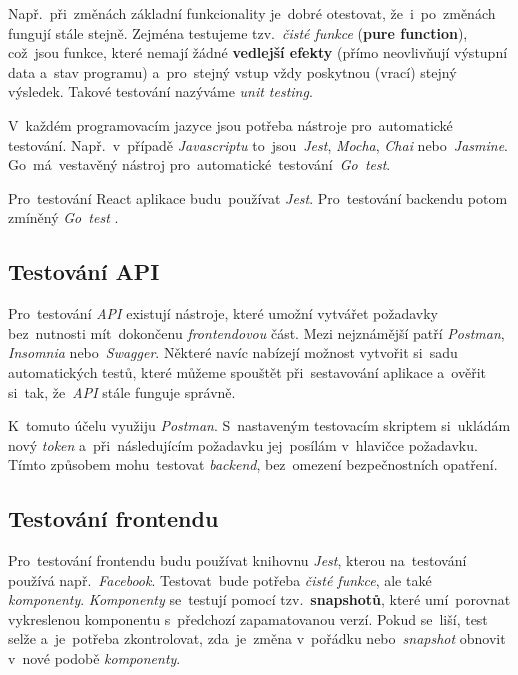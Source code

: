 \documentclass[11pt,a4paper]{report}
\begin{document}
            Např.~při~změnách základní funkcionality je~dobré otestovat, že~i~po~změnách fungují stále stejně. Zejména testujeme tzv.~\emph{čisté funkce} (\textbf{pure function}), což~jsou funkce, které nemají žádné \textbf{vedlejší efekty} (přímo neovlivňují výstupní data a~stav programu) a~pro~stejný vstup vždy poskytnou (vrací) stejný výsledek. Takové testování nazýváme \emph{unit testing}.
            
            V~každém programovacím jazyce jsou potřeba nástroje pro~automatické testování. Např.~v~případě \emph{Javascriptu} to~jsou~\emph{Jest}, \emph{Mocha}, \emph{Chai} nebo~\emph{Jasmine}. Go~má~vestavěný nástroj pro~automatické~testování~\emph{Go~test}.
            
            Pro~testování React aplikace budu~používat \emph{Jest}. Pro~testování backendu potom zmíněný \emph{Go~test} \cite{jestjsTestingReact}.
            
            \subsection{Testování API}
                Pro~testování \emph{API} existují nástroje, které umožní vytvářet požadavky bez~nutnosti mít~dokončenu \emph{frontendovou} část. Mezi nejznámější patří \emph{Postman}, \emph{Insomnia} nebo~\emph{Swagger}. Některé navíc nabízejí možnost vytvořit si~sadu automatických testů, které můžeme spouštět při~sestavování aplikace a~ověřit si~tak, že~\emph{API} stále funguje správně.

                K~tomuto účelu využiju \emph{Postman}. S~nastaveným testovacím skriptem si~ukládám nový \emph{token} a~při~následujícím požadavku jej~posílám v~hlavičce požadavku. Tímto způsobem mohu~testovat \emph{backend}, bez~omezení bezpečnostních opatření.

            \subsection{Testování frontendu}
                Pro~testování frontendu budu používat knihovnu \emph{Jest}, kterou na~testování používá např.~\emph{Facebook}. Testovat~bude potřeba \emph{čisté funkce}, ale také \emph{komponenty}. \emph{Komponenty} se~testují pomocí tzv.~\textbf{snapshotů}, které umí~porovnat vykreslenou komponentu s~předchozí zapamatovanou verzí. Pokud se~liší, test selže a~je~potřeba zkontrolovat, zda~je~změna v~pořádku nebo~\emph{snapshot} obnovit v~nové podobě \emph{komponenty}. \cite{jestjsTestingReact}
\end{document}
